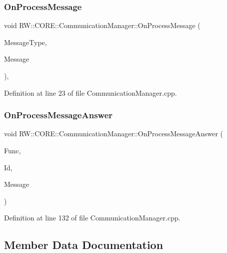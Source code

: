 \subsubsection{\texorpdfstring{On\+Process\+Message}{OnProcessMessage}}
{\footnotesize\ttfamily void R\+W\+::\+C\+O\+R\+E\+::\+Communication\+Manager\+::\+On\+Process\+Message (\begin{DoxyParamCaption}\item[{Util\+::\+Functions}]{Message\+Type,  }\item[{Q\+Byte\+Array}]{Message }\end{DoxyParamCaption})\hspace{0.3cm}{\ttfamily [private]}, {\ttfamily [slot]}}



Definition at line 23 of file Communication\+Manager.\+cpp.

\hypertarget{class_r_w_1_1_c_o_r_e_1_1_communication_manager_a7c890fda317487cb2892d728e0b7e131}{}\label{class_r_w_1_1_c_o_r_e_1_1_communication_manager_a7c890fda317487cb2892d728e0b7e131} 
\subsubsection{\texorpdfstring{On\+Process\+Message\+Answer}{OnProcessMessageAnswer}}
{\footnotesize\ttfamily void R\+W\+::\+C\+O\+R\+E\+::\+Communication\+Manager\+::\+On\+Process\+Message\+Answer (\begin{DoxyParamCaption}\item[{Util\+::\+Functions}]{Func,  }\item[{Util\+::\+Error\+ID}]{Id,  }\item[{Q\+Byte\+Array}]{Message }\end{DoxyParamCaption})\hspace{0.3cm}{\ttfamily [slot]}}



Definition at line 132 of file Communication\+Manager.\+cpp.



\subsection{Member Data Documentation}
\hypertarget{class_r_w_1_1_c_o_r_e_1_1_communication_manager_ab4035d32b76f3856ba059bed7261ae85}{}\label{class_r_w_1_1_c_o_r_e_1_1_communication_manager_ab4035d32b76f3856ba059bed7261ae85} 

